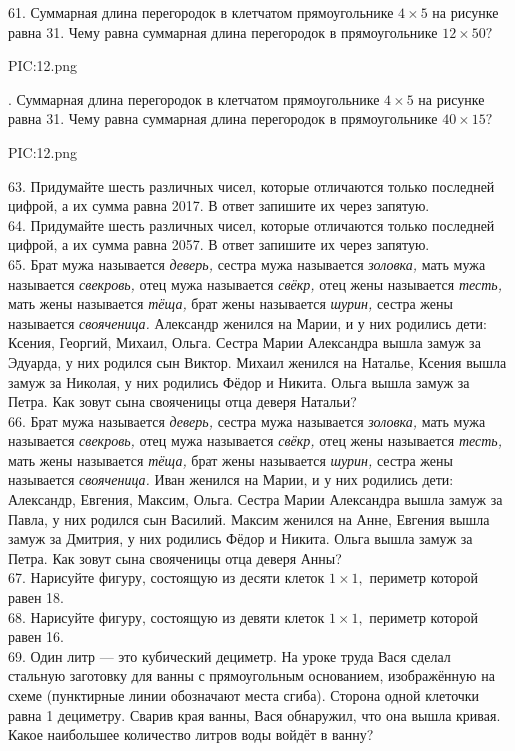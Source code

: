 61. Суммарная длина перегородок в клетчатом прямоугольнике $4\times5$ на рисунке равна 31. Чему равна суммарная длина перегородок в прямоугольнике $12\times50?$
\begin{center}
{{PIC:12.png}}
\end{center}
\newpage
{}. Суммарная длина перегородок в клетчатом прямоугольнике $4\times5$ на рисунке равна 31. Чему равна суммарная длина перегородок в прямоугольнике $40\times15?$
\begin{center}
{{PIC:12.png}}
\end{center}
63. Придумайте шесть различных чисел, которые отличаются только последней цифрой, а их сумма равна 2017. В ответ запишите их через запятую.\\
64. Придумайте шесть различных чисел, которые отличаются только последней цифрой, а их сумма равна 2057. В ответ запишите их через запятую.\\
65. Брат мужа называется {\it деверь,} сестра мужа называется {\it золовка,} мать мужа называется {\it свекровь,} отец мужа называется {\it свёкр,} отец жены называется {\it тесть,} мать жены называется {\it тёща,} брат жены называется {\it шурин,} сестра жены называется {\it свояченица.} Александр женился на Марии, и у них родились дети: Ксения, Георгий, Михаил, Ольга. Сестра Марии Александра вышла замуж за Эдуарда, у них родился сын Виктор. Михаил женился на Наталье, Ксения вышла замуж за Николая, у них родились Фёдор и Никита. Ольга вышла замуж за Петра. Как зовут сына свояченицы отца деверя Натальи?\\
66.  Брат мужа называется {\it деверь,} сестра мужа называется {\it золовка,} мать мужа называется {\it свекровь,} отец мужа называется {\it свёкр,} отец жены называется {\it тесть,} мать жены называется {\it тёща,} брат жены называется {\it шурин,} сестра жены называется {\it свояченица.} Иван женился на Марии, и у них родились дети: Александр, Евгения, Максим, Ольга. Сестра Марии Александра вышла замуж за Павла, у них родился сын Василий. Максим женился на Анне, Евгения вышла замуж за Дмитрия, у них родились Фёдор и Никита. Ольга вышла замуж за Петра. Как зовут сына свояченицы отца деверя Анны?\\
67. Нарисуйте фигуру, состоящую из десяти клеток $1\times1,$ периметр которой равен 18.\\
68. Нарисуйте фигуру, состоящую из девяти клеток $1\times1,$ периметр которой равен 16.\\
69. Один литр --- это кубический дециметр. На уроке труда Вася сделал стальную заготовку для ванны с прямоугольным основанием, изображённую на схеме (пунктирные линии обозначают места сгиба). Сторона одной клеточки равна 1 дециметру. Сварив края ванны, Вася обнаружил, что она вышла кривая. Какое наибольшее количество литров воды войдёт в ванну?
